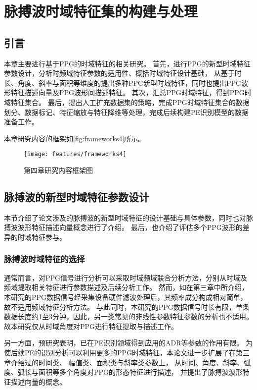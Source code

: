 \chapter{脉搏波时域特征集的构建与处理}
\section{引言}
本章主要进行基于PPG的时域特征的相关研究。
首先，进行PPG的新型时域特征参数设计，分析时频域特征参数的适用性、概括时域特征设计基础，
从基于时长、角度、斜率与面积等维度的提出多种PPG新型时域特征，同时也提出PPG波形特征描述向量及PPG波形间描述特征。
其次，汇总PPG时域特征，得到PPG时域特征集合。
最后，提出人工扩充数据集的策略，完成PPG时域特征集合的数据划分、数据标记、特征缩放与特征降维等处理，完成后续构建PE识别模型的数据准备工作。

本章研究内容的框架如\autoref{fig:frameworks4}所示。
\begin{figure}[htbp]
    \centering
    \texttt{[image: features/frameworks4]}
    \caption{\label{fig:frameworks4}第四章研究内容框架图}
\end{figure}

\section{脉搏波的新型时域特征参数设计}
本节介绍了论文涉及的脉搏波的新型时域特征的设计基础与具体参数，同时也对脉搏波波形特征描述向量概念进行了介绍。
最后，也介绍了评估多个PPG波形的差异的时域特征参与。

\subsection{脉搏波时域特征的选择}
通常而言，对PPG信号进行分析可以采取时域频域联合分析方法，分别从时域及频域提取相关特征进行参数描述及后续分析工作。
然而，如在第三章中所介绍，本研究的PPG数据信号经采集设备硬件滤波处理后，其频率成分构成相对简单，故不适用频域特征分析方法。
与此同时，本研究的PPG数据信号时长有限，单条数据长度约1至3分钟，因此，另一类常见的非线性参数特征参数的分析也不适用。
故本研究仅从时域角度对PPG进行特征提取与描述工作。

另一方面，预研究表明，已在PE识别领域得到应用的ADR等参数的作用有限\cite{Feng2018,ChenH2019}。
为使后续PE的识别分析可以利用更多的PPG时域特征，本论文进一步扩展了在第三章介绍过的时间类\cite{Chen2019,mmt,Brumfield2005,Su2014}、
幅值类\cite{Su2014,Elgendi2012,Luo1988,PPGYY}、面积类\cite{Feng2018}与斜率类\cite{Chen2019}参数上，
从时间、角度、斜率、弧度、弧长与面积等多个角度对PPG的形态特征进行描述\cite{ChenH2019,Feng2023,FengJiang2018}，
并提出了脉搏波波形特征描述向量的概念\cite{ChenH2019,Feng2023,FengJiang2018}。

